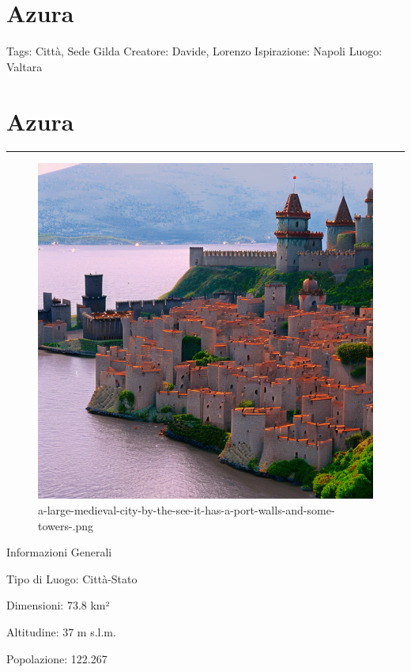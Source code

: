 \section{Azura}\label{azura}

Tags: Città, Sede Gilda Creatore: Davide, Lorenzo Ispirazione: Napoli
Luogo: Valtara

\section{Azura}\label{azura-1}

\begin{center}\rule{0.5\linewidth}{0.5pt}\end{center}

\begin{figure}
\centering
\includegraphics{a-large-medieval-city-by-the-see-it-has-a-port-walls-and-some-towers-.png}
\caption{a-large-medieval-city-by-the-see-it-has-a-port-walls-and-some-towers-.png}
\end{figure}

Informazioni Generali

Tipo di Luogo: Città-Stato

Dimensioni: 73.8 km²

Altitudine: 37 m s.l.m.

Popolazione: 122.267

